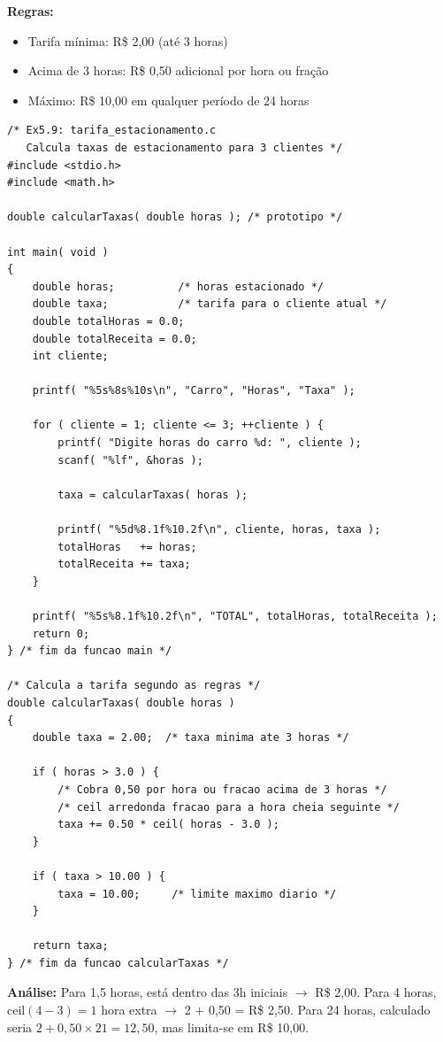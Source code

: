 \documentclass[12pt,a4paper]{article}
\begin{document}
\begin{respostabox}
\textbf{Regras:}
\begin{itemize}[noitemsep]
  \item Tarifa mínima: R\$ 2,00 (até 3 horas)
  \item Acima de 3 horas: R\$ 0,50 adicional por hora ou fração
  \item Máximo: R\$ 10,00 em qualquer período de 24 horas
\end{itemize}

\begin{lstlisting}
/* Ex5.9: tarifa_estacionamento.c
   Calcula taxas de estacionamento para 3 clientes */
#include <stdio.h>
#include <math.h>

double calcularTaxas( double horas ); /* prototipo */

int main( void )
{
    double horas;          /* horas estacionado */
    double taxa;           /* tarifa para o cliente atual */
    double totalHoras = 0.0;
    double totalReceita = 0.0;
    int cliente;

    printf( "%5s%8s%10s\n", "Carro", "Horas", "Taxa" );

    for ( cliente = 1; cliente <= 3; ++cliente ) {
        printf( "Digite horas do carro %d: ", cliente );
        scanf( "%lf", &horas );

        taxa = calcularTaxas( horas );

        printf( "%5d%8.1f%10.2f\n", cliente, horas, taxa );
        totalHoras   += horas;
        totalReceita += taxa;
    }

    printf( "%5s%8.1f%10.2f\n", "TOTAL", totalHoras, totalReceita );
    return 0;
} /* fim da funcao main */

/* Calcula a tarifa segundo as regras */
double calcularTaxas( double horas )
{
    double taxa = 2.00;  /* taxa minima ate 3 horas */

    if ( horas > 3.0 ) {
        /* Cobra 0,50 por hora ou fracao acima de 3 horas */
        /* ceil arredonda fracao para a hora cheia seguinte */
        taxa += 0.50 * ceil( horas - 3.0 );
    }

    if ( taxa > 10.00 ) {
        taxa = 10.00;     /* limite maximo diario */
    }

    return taxa;
} /* fim da funcao calcularTaxas */
\end{lstlisting}

\textbf{Análise:} Para 1{,}5 horas, está dentro das 3h iniciais $\to$ R\$ 2,00.
Para 4 horas, $\text{ceil}(4{-}3) = 1$ hora extra $\to$ 2 + 0{,}50 = R\$ 2,50.
Para 24 horas, calculado seria $2 + 0{,}50 \times 21 = 12{,}50$, mas limita-se em
R\$ 10,00.
\end{respostabox}
\end{document}
